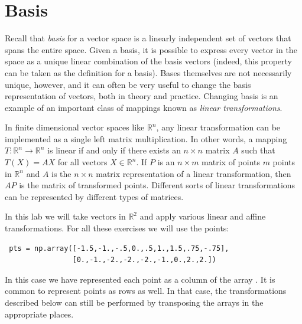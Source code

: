 \label{lab:ChangeBasis}



\section*{Basis}

Recall that \emph{basis} for a vector space is a linearly independent set of vectors
that spans the entire space. Given a basis, it is possible to express
every vector in the space as a unique linear combination of the basis vectors
(indeed, this property can be taken as the definition for a basis).
Bases themselves are not necessarily unique, however, and it can often be
very useful to change the basis representation of vectors, both in theory and
practice. Changing basis is an example of an important class of mappings
known as \emph{linear transformations}.

In finite dimensional vector spaces like $\mathbb{R}^n$, any linear
transformation can be implemented as a single left matrix multiplication.
In other words, a mapping $T : \mathbb{R}^n \to \mathbb{R}^n$ is linear if and
only if there exists an $n \times n$ matrix $A$ such that $T\left(X\right) = AX$
for all vectors $X \in \mathbb{R}^n$.
If $P$ is an $n \times m$ matrix of points $m$ points in $\mathbb{R}^n$ and $A$
is the $n \times n$ matrix representation of a linear transformation, then $AP$
is the matrix of transformed points.
Different sorts of linear transformations can be represented by different types
of matrices.

In this lab we will take vectors in $\mathbb{R}^2$ and apply various linear and
affine transformations.
For all these exercises we will use the points:
\begin{lstlisting}
 pts = np.array([-1.5,-1.,-.5,0.,.5,1.,1.5,.75,-.75],
                [0.,-1.,-2.,-2.,-2.,-1.,0.,2.,2.])
\end{lstlisting}
In this case we have represented each point as a column of the array .
It is common to represent points as rows as well.
In that case, the transformations described below can still be performed by
transposing the arrays in the appropriate places.

